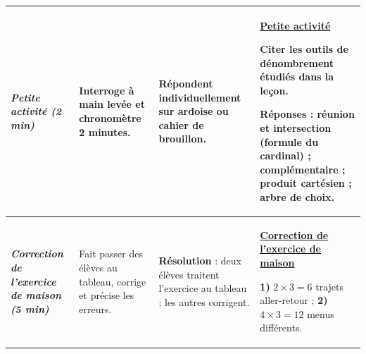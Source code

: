 \documentclass[10pt]{article}
\newcommand{\titreR}[1]{\underline{\textcolor{rougetitre}{\bfseries #1}}}
\newcommand{\seance}[1]{\fcolorbox{bleuseance}{bleufond}{\textcolor{bleuseance}{\bfseries #1}}}
\newcommand{\moment}[1]{\textbf{\itshape #1}}
\begin{document}
\begin{longtable}{|p{2.35cm}|p{5.35cm}|p{4.55cm}|p{13.85cm}|}
\hline
\seance{SEANCE 6} \newline \moment{Petite activité (2 min)} &
Interroge à main levée et chronomètre 2 minutes. &
Répondent individuellement sur ardoise ou cahier de brouillon. &
\titreR{Petite activité} \par
Citer les outils de dénombrement étudiés dans la leçon. \par
\textbf{Réponses :} réunion et intersection (formule du cardinal) ; complémentaire ;
produit cartésien ; arbre de choix. \\ \hline

\moment{Correction de l'exercice de maison (5 min)} &
Fait passer des élèves au tableau, corrige et précise les erreurs. &
\textbf{Résolution} : deux élèves traitent l'exercice au tableau ; les autres corrigent. &
\titreR{Correction de l'exercice de maison} \par
\textbf{1)} $2\times3=6$ trajets aller-retour ; \;
\textbf{2)} $4\times3=12$ menus différents. \\ \hline


\end{longtable}
\end{document}
